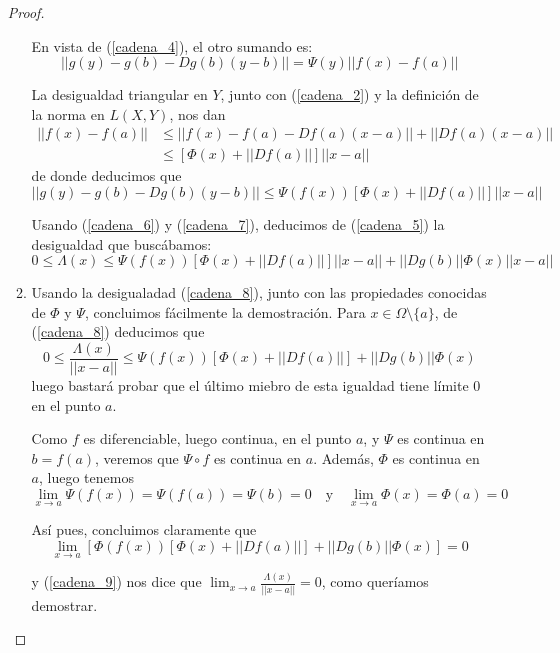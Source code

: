 \documentclass[a4paper, 12pt]{article}
\begin{document}
\begin{enumerate}[label=\textbf{\arabic*}.]
\begin{proof}
\begin{enumerate}[label=\textbf{(\alph*).}]
		En vista de (\ref{cadena_4}), el otro sumando es:
		\[
		||g(y) - g(b) - Dg(b)(y-b)|| = \Psi (y) ||f(x) - f(a)||
		\]
		
		La desigualdad triangular en \(Y\), junto con (\ref{cadena_2}) y la definición de la norma en \(L(X,Y)\), nos dan
		\[
		\begin{array}{ll}
		||f(x) - f(a)|| & \leq ||f(x) - f(a) - Df(a)(x-a)|| + ||Df(a)(x-a)|| \\
		& \leq [\Phi (x) + ||Df(a)||] ||x-a||
		\end{array}
		\]
		de donde deducimos que 
		\begin{equation}\label{cadena_7}
		 || g(y) - g(b) -Dg(b)(y-b)|| \leq \Psi (f(x)) [ \Phi (x) + ||Df(a)||] ||x-a||
		\end{equation}
		
		Usando (\ref{cadena_6}) y (\ref{cadena_7}), deducimos de (\ref{cadena_5}) la desigualdad que buscábamos:
		\begin{equation}\label{cadena_8}
		0 \leq \Lambda (x) \leq \Psi (f(x)) [ \Phi (x) + || Df(a)|| ] ||x-a|| + ||Dg(b)|| \Phi (x) ||x-a||
		\end{equation}
		
		\item Usando la desigualadad (\ref{cadena_8}), junto con las propiedades conocidas de \(\Phi\) y \(\Psi\), concluimos fácilmente la demostración. Para \(x \in \Omega \setminus \{a\}\), de (\ref{cadena_8}) deducimos que 
		\begin{equation}\label{cadena_9}
		0 \leq \frac{\Lambda (x)}{||x-a||} \leq \Psi (f(x)) [ \Phi (x) + ||Df(a)||] + ||Dg(b)|| \Phi (x)
		\end{equation}
		luego bastará probar que el último miebro de esta igualdad tiene límite 0 en el punto \(a\).
		
		Como \(f\) es diferenciable, luego continua, en el punto \(a\), y \(\Psi\) es continua en \(b = f(a)\), veremos que \(\Psi \circ f\) es continua en \(a\). Además, \(\Phi\) es continua en \(a\), luego tenemos
		\[
			\lim_{x \to a} \Psi (f(x)) = \Psi (f(a)) = \Psi (b) = 0 \quad \text{y} \quad \lim_{x \to a} \Phi (x) = \Phi (a) = 0
		\]
		
		Así pues, concluimos claramente que 
		\[
			\lim_{x \to a} \left[ \Phi (f(x)) [ \Phi (x) + ||Df(a)||] + ||Dg(b)|| \Phi (x) \right] = 0
		\]
		
		y (\ref{cadena_9}) nos dice que \(\lim_{x \to a} \frac{\Lambda (x)}{||x-a||} = 0\), como queríamos demostrar.
	\end{enumerate}
	\end{proof}
\end{enumerate}
\end{document}
